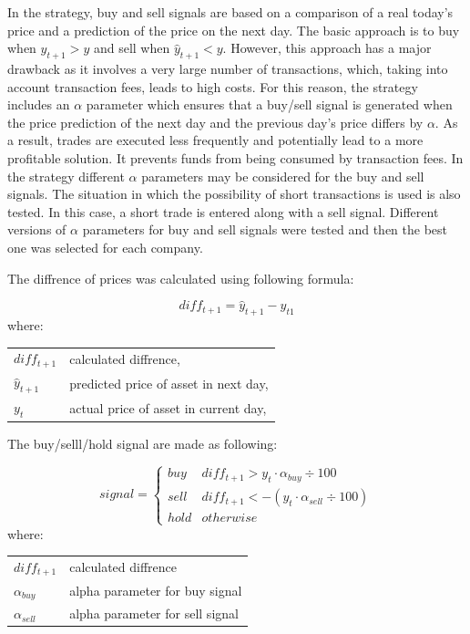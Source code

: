 \documentclass[11pt]{article} %
\makeatletter
\newenvironment{conditions}
  {\par\vspace{\abovedisplayskip}\noindent\begin{tabular}{>{$}l<{$} @{${}={}$} l}}
  {\end{tabular}\par\vspace{\belowdisplayskip}}
\makeatother
\begin{document}
In the strategy, buy and sell signals are based on a comparison of a real today's price and a prediction of the price on the next day. The basic approach is to buy when $\hat{y}_{t+1} > y$ and sell when $\hat{y}_{t+1} < y$. However, this approach has a major drawback as it involves a very large number of transactions, which, taking into account transaction fees, leads to high costs. For this reason, the strategy includes an $\alpha$ parameter which ensures that a buy/sell signal is generated when the price prediction of the next day and the previous day's price differs by $\alpha$. As a result, trades are executed less frequently and potentially lead to a more profitable solution. It prevents funds from being consumed by transaction fees. In the strategy different $\alpha$ parameters may be considered for the buy and sell signals. The situation in which the possibility of short transactions is used is also tested. In this case, a short trade is entered along with a sell signal. 
Different versions of $\alpha$ parameters for buy and sell signals were tested and then the best one was selected for each company.

The diffrence of prices was calculated using following formula:

\begin{equation}  diff_{t+1} = \hat{y}_{t+1} - y_{t1} \end{equation}
where:
\begin{conditions}
diff_{t+1} & calculated diffrence, \\ 
 \hat{y}_{t+1}     &   predicted price of asset in next day,\\
 y_{t}     &  actual price of asset in current day,\\   
\end{conditions}

 \begin{flushleft} The buy/selll/hold signal are made as following: \end{flushleft} 
\begin{equation}
signal =  \left\{\begin{array}{ll} buy & diff_{t+1} >  y_{t} \cdot  \alpha_{buy} \div 100 \\ sell & diff_{t+1} <  -(y_{t} \cdot  \alpha_{sell} \div 100)\\  hold & otherwise \end{array}\right.
\end{equation}
where:
\begin{conditions}
diff_{t+1} & calculated diffrence \\ 
\alpha_{buy}     &  alpha parameter for buy signal \\   
\alpha_{sell}     &  alpha parameter for sell signal\\   
\end{conditions}
\end{document}
